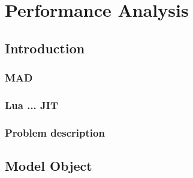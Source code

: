 \documentclass[12pt, oneside]{Thesis}
\begin{document}




\mainmatter
\pagestyle{fancy}

\part{Performance Analysis}
\label{Part:mad}

  \chapter{Introduction}
  \label{Chapt:Intro}

    \section{MAD}
    \label{Sec:mad}
    

    \section{Lua ... JIT}
    \label{Sec:LuaJIT}
    

    \section{Problem description}
    \label{Sec:Problem-description}
    

  \chapter{Model Object}
  \label{Chapt:MO}
  


\end{document}
